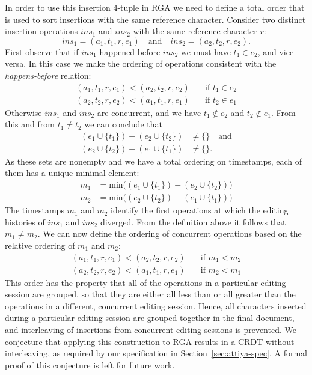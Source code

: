 \documentclass[sigconf]{acmart}
\begin{document}
In order to use this insertion 4-tuple in RGA we need to define a total order that is used to sort insertions with the same reference character.
Consider two distinct insertion operations $\mathit{ins}_1$ and $\mathit{ins}_2$ with the same reference character $r$:
\[ \mathit{ins}_1 = (a_1, t_1, r, e_1) \quad\text{and}\quad \mathit{ins}_2 = (a_2, t_2, r, e_2). \]
First observe that if $\mathit{ins}_1$ happened before $\mathit{ins}_2$ we must have $t_1 \in e_2$, and vice versa.
In this case we make the ordering of operations consistent with the \emph{happens-before} relation:
\begin{align*}
(a_1, t_1, r, e_1) < (a_2, t_2, r, e_2) &\quad\text{if } t_1 \in e_2 \\
(a_2, t_2, r, e_2) < (a_1, t_1, r, e_1) &\quad\text{if } t_2 \in e_1
\end{align*}
Otherwise $\mathit{ins}_1$ and $\mathit{ins}_2$ are concurrent, and we have $t_1 \notin e_2$ and $t_2 \notin e_1$.
From this and from $t_1 \ne t_2$ we can conclude that
\begin{align*}
(e_1 \cup \{t_1\}) - (e_2 \cup \{t_2\}) &\ne \{\} \quad\text{and}\\
(e_2 \cup \{t_2\}) - (e_1 \cup \{t_1\}) &\ne \{\}.
\end{align*}
As these sets are nonempty and we have a total ordering on timestamps, each of them has a unique minimal element:
\begin{align*}
m_1 &= \mathrm{min}\big( (e_1 \cup \{t_1\}) - (e_2 \cup \{t_2\}) \big) \\
m_2 &= \mathrm{min}\big( (e_2 \cup \{t_2\}) - (e_1 \cup \{t_1\}) \big)
\end{align*}
The timestamps $m_1$ and $m_2$ identify the first operations at which the editing histories of $\mathit{ins}_1$ and $\mathit{ins}_2$ diverged.
From the definition above it follows that $m_1 \ne m_2$.
We can now define the ordering of concurrent operations based on the relative ordering of $m_1$ and $m_2$:
\begin{align*}
(a_1, t_1, r, e_1) < (a_2, t_2, r, e_2) &\quad\text{if } m_1 < m_2 \\
(a_2, t_2, r, e_2) < (a_1, t_1, r, e_1) &\quad\text{if } m_2 < m_1
\end{align*}
This order has the property that all of the operations in a particular editing session are grouped, so that they are either all less than or all greater than the operations in a different, concurrent editing session.
Hence, all characters inserted during a particular editing session are grouped together in the final document, and interleaving of insertions from concurrent editing sessions is prevented.
We conjecture that applying this construction to RGA results in a CRDT without interleaving, as required by our specification in Section~\ref{sec:attiya-spec}.
A formal proof of this conjecture is left for future work.
\end{document}
